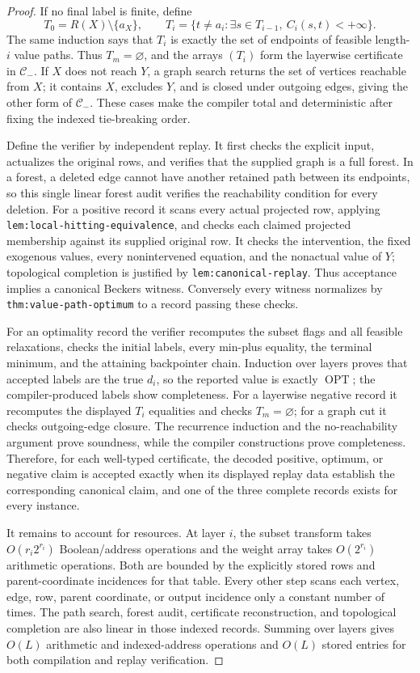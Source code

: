 \documentclass{article}
\begin{document}
\begin{proof}
If no final label is finite, define
\[
 T_0=R(X)\setminus\{a_X\},\qquad
 T_i=\{t\ne a_i:\exists s\in T_{i-1},\ C_i(s,t)<+\infty\}.
\]
The same induction says that \(T_i\) is exactly the set of endpoints of feasible length-\(i\) value paths.  Thus \(T_m=\varnothing\), and the arrays \((T_i)\) form the layerwise certificate in \(\mathcal C_{-}\).  If \(X\) does not reach \(Y\), a graph search returns the set of vertices reachable from \(X\); it contains \(X\), excludes \(Y\), and is closed under outgoing edges, giving the other form of \(\mathcal C_{-}\).  These cases make the compiler total and deterministic after fixing the indexed tie-breaking order.

Define the verifier by independent replay.  It first checks the explicit input, actualizes the original rows, and verifies that the supplied graph is a full forest.  In a forest, a deleted edge cannot have another retained path between its endpoints, so this single linear forest audit verifies the reachability condition for every deletion.  For a positive record it scans every actual projected row, applying \texttt{lem:local-hitting-equivalence}, and checks each claimed projected membership against its supplied original row.  It checks the intervention, the fixed exogenous values, every nonintervened equation, and the nonactual value of \(Y\); topological completion is justified by \texttt{lem:canonical-replay}.  Thus acceptance implies a canonical Beckers witness.  Conversely every witness normalizes by \texttt{thm:value-path-optimum} to a record passing these checks.

For an optimality record the verifier recomputes the subset flags and all feasible relaxations, checks the initial labels, every min-plus equality, the terminal minimum, and the attaining backpointer chain.  Induction over layers proves that accepted labels are the true \(d_i\), so the reported value is exactly \(\operatorname{OPT}\); the compiler-produced labels show completeness.  For a layerwise negative record it recomputes the displayed \(T_i\) equalities and checks \(T_m=\varnothing\); for a graph cut it checks outgoing-edge closure.  The recurrence induction and the no-reachability argument prove soundness, while the compiler constructions prove completeness.  Therefore, for each well-typed certificate, the decoded positive, optimum, or negative claim is accepted exactly when its displayed replay data establish the corresponding canonical claim, and one of the three complete records exists for every instance.

It remains to account for resources.  At layer \(i\), the subset transform takes \(O(r_i2^{r_i})\) Boolean/address operations and the weight array takes \(O(2^{r_i})\) arithmetic operations.  Both are bounded by the explicitly stored rows and parent-coordinate incidences for that table.  Every other step scans each vertex, edge, row, parent coordinate, or output incidence only a constant number of times.  The path search, forest audit, certificate reconstruction, and topological completion are also linear in those indexed records.  Summing over layers gives \(O(L)\) arithmetic and indexed-address operations and \(O(L)\) stored entries for both compilation and replay verification.


\end{proof}
\end{document}
